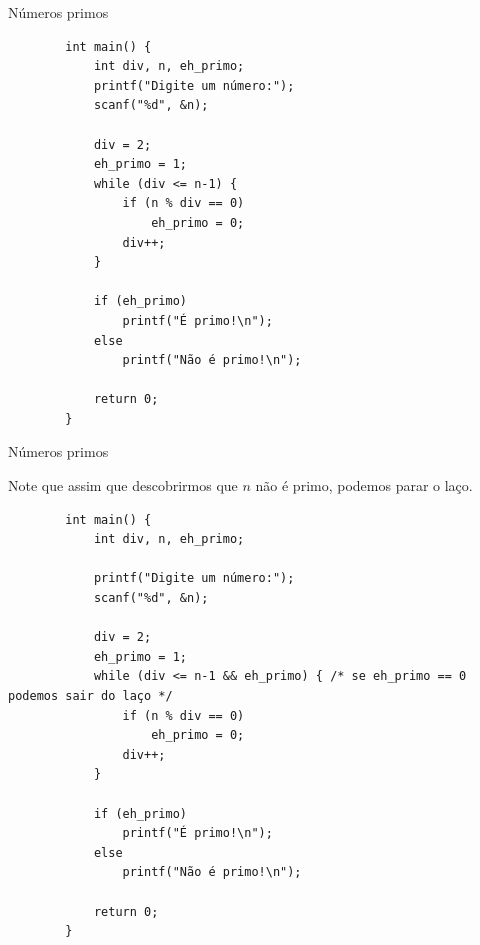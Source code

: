 \documentclass[handout]{beamer}
\begin{document}
\begin{frame}[fragile]{Números primos}

    \begin{verbatim}
        int main() {
            int div, n, eh_primo;
            printf("Digite um número:");
            scanf("%d", &n);

            div = 2;
            eh_primo = 1;
            while (div <= n-1) {
                if (n % div == 0)
                    eh_primo = 0;
                div++;
            }

            if (eh_primo)
                printf("É primo!\n");
            else
                printf("Não é primo!\n");

            return 0;
        }
    \end{verbatim}
\end{frame}

\begin{frame}[fragile]{Números primos}

    Note que assim que descobrirmos que $n$ não é primo, podemos parar o laço.

    \begin{verbatim}
        int main() {
            int div, n, eh_primo;
            
            printf("Digite um número:");
            scanf("%d", &n);
            
            div = 2;
            eh_primo = 1;
            while (div <= n-1 && eh_primo) { /* se eh_primo == 0 podemos sair do laço */
                if (n % div == 0)
                    eh_primo = 0;
                div++;
            }
    
            if (eh_primo)
                printf("É primo!\n");
            else
                printf("Não é primo!\n");

            return 0;
        }
    \end{verbatim}
\end{frame}
\end{document}
